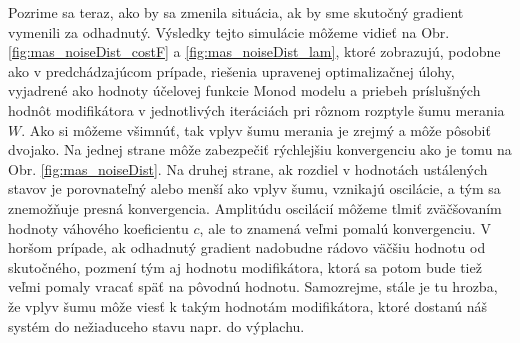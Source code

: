 Pozrime sa teraz, ako by sa zmenila situácia, ak by sme skutočný gradient vymenili za odhadnutý. Výsledky tejto simulácie môžeme vidieť na Obr. \ref{fig:mas_noiseDist_costF} a \ref{fig:mas_noiseDist_lam}, ktoré zobrazujú, podobne ako v predchádzajúcom prípade, riešenia upravenej optimalizačnej úlohy, vyjadrené ako hodnoty účelovej funkcie Monod modelu a priebeh príslušných hodnôt modifikátora v jednotlivých iteráciách pri rôznom 
rozptyle šumu merania $ W $. Ako si môžeme všimnúť, tak vplyv šumu merania je zrejmý a môže pôsobiť dvojako. Na jednej strane môže zabezpečiť rýchlejšiu konvergenciu ako je tomu na Obr.  \ref{fig:mas_noiseDist}. Na druhej strane, ak rozdiel v hodnotách ustálených stavov je porovnateľný alebo menší ako vplyv šumu, vznikajú oscilácie, a tým sa znemožňuje presná konvergencia. Amplitúdu oscilácií môžeme tlmiť zväčšovaním hodnoty váhového koeficientu $ c $, ale to znamená veľmi pomalú konvergenciu. V horšom prípade, ak odhadnutý gradient nadobudne rádovo väčšiu hodnotu od skutočného, pozmení tým aj hodnotu modifikátora, ktorá sa potom bude tiež veľmi pomaly vracať späť na pôvodnú hodnotu. Samozrejme, stále je tu hrozba, že vplyv šumu môže viesť k takým hodnotám modifikátora, ktoré dostanú náš systém do nežiaduceho stavu napr. do výplachu. 

